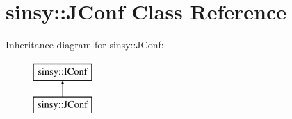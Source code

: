 \hypertarget{classsinsy_1_1JConf}{\section{sinsy\-:\-:\-J\-Conf \-Class \-Reference}
\label{classsinsy_1_1JConf}
}
\-Inheritance diagram for sinsy\-:\-:\-J\-Conf\-:\begin{figure}[H]
\begin{center}
\leavevmode
\includegraphics[height=2.000000cm]{classsinsy_1_1JConf}
\end{center}
\end{figure}
